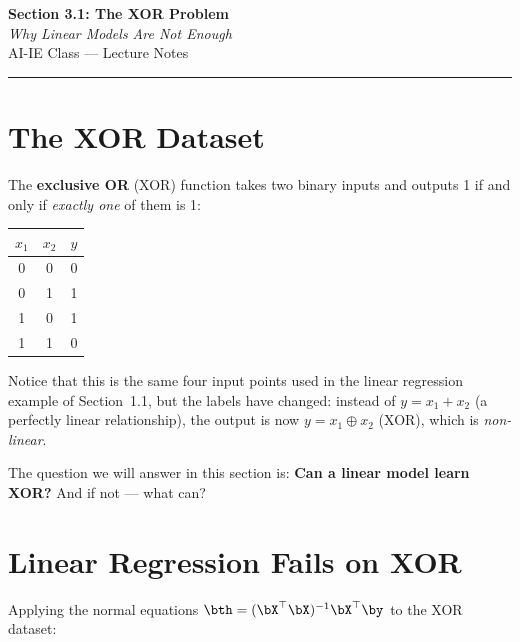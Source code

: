 \documentclass[12pt, a4paper]{article}
\begin{document}
\begin{center}
  {\LARGE \textbf{Section 3.1: The XOR Problem}} \\[0.3em]
  {\large\itshape Why Linear Models Are Not Enough} \\[0.5em]
  {\large AI-IE Class — Lecture Notes}%
  \ifstudentmode
  \fi
\end{center}

\vspace{1em}
\hrule
\vspace{1.5em}

\section{The XOR Dataset}

The \textbf{exclusive OR} (XOR) function takes two binary inputs and outputs 1
if and only if \emph{exactly one} of them is 1:

\begin{center}
  \renewcommand{\arraystretch}{1.2}
  \begin{tabular}{ccc}
    \toprule
    $x_1$ & $x_2$ & $y$ \\
    \midrule
    0     & 0     & 0   \\
    0     & 1     & 1   \\
    1     & 0     & 1   \\
    1     & 1     & 0   \\
    \bottomrule
  \end{tabular}
\end{center}

Notice that this is the same four input points used in the linear regression
example of Section~1.1, but the labels have changed: instead of $y = x_1 + x_2$
(a perfectly linear relationship), the output is now $y = x_1 \oplus x_2$
(XOR), which is \emph{non-linear}.

The question we will answer in this section is:
\textbf{Can a linear model learn XOR?} And if not — what can?

\section{Linear Regression Fails on XOR}

Applying the normal equations $\bth = (\bX^{\top}\bX)^{-1}\bX^{\top}\by$ to
the XOR dataset:
\end{document}
